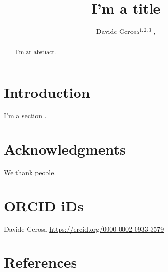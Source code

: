 \documentclass[]{iopart}
\newcommand{\bham}{{School of Physics and Astronomy \& Institute for Gravitational Wave Astronomy, University of Birmingham, Birmingham, B15 2TT, UK}}
\newcommand{\milan}{{Dipartimento di Fisica ``G. Occhialini'', Universit\'a degli Studi di Milano-Bicocca, Piazza della Scienza 3, 20126 Milano, Italy}}
\newcommand{\infn}{{INFN, Sezione di Milano-Bicocca, Piazza della Scienza 3, 20126 Milano, Italy}}
\begin{document}
\begin{center}
\title[D.~Gerosa et al.]{I'm a title}
\end{center}

\author{
Davide Gerosa$^{1,2,3}$ ,
}
\vspace{0.1cm}
\address{$^{1}$~\milan}
\address{$^{2}$~\infn}
\address{$^{3}$~\bham}


\setcounter{footnote}{0}


\begin{abstract}
I'm an abstract. \lipsum[1]
\end{abstract}


\section{Introduction}

I'm a section \cite{2016PhRvL.116f1102A}. \lipsum[2-3]



\section*{Acknowledgments}

We thank people. \lipsum[4]

\section*{ORCID iDs}
Davide Gerosa  \href{https://orcid.org/0000-0002-0933-3579}{https://orcid.org/0000-0002-0933-3579} \\


\section*{References}


\end{document}
